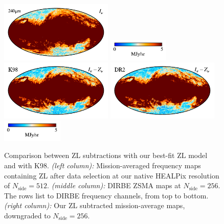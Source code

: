 \documentclass[twocolumn]{aa}
\begin{document}
\begin{figure}
    \includegraphics[height=2.90cm]{figs/compare_freq_maps/cosmoglobe_ma_10.pdf}%
    \includegraphics[width=2.90cm,angle=90]{figs/compare_freq_maps/cbar_tot_10.pdf}%
    \includegraphics[height=2.90cm]{figs/compare_freq_maps/dirbe_zsma_10.pdf}%
    \includegraphics[height=2.90cm]{figs/compare_freq_maps/cosmoglobe_zsma_10.pdf}%
    \includegraphics[width=2.90cm,angle=90]{figs/compare_freq_maps/cbar_10.pdf}%
      \\

    \caption{Comparison between ZL subtractions with our best-fit ZL model and with K98. 
    \textit{(left column):} Mission-averaged frequency maps containing ZL after data selection at our native HEALPix resolution 
    of $N_\mathrm{side} = 512$. \textit{(middle column):} DIRBE ZSMA maps
    at $N_\mathrm{side} = 256$. The rows list to DIRBE frequency channels, from top to 
    bottom. \textit{(right column):} Our ZL subtracted mission-average 
    maps, downgraded to $N_\mathrm{side} = 256$. 
    }    
    \label{fig:dr2-zsma-compare2}
\end{figure}
\end{document}
